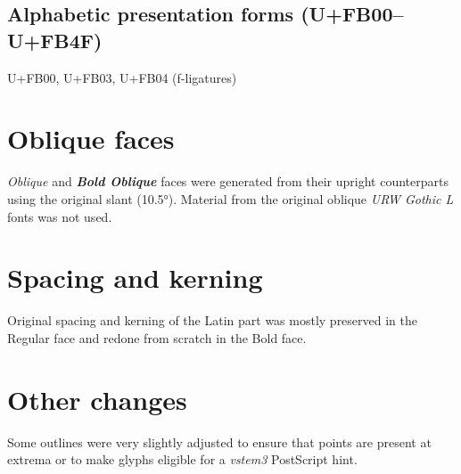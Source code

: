 \documentclass[a4paper,12pt,oneside,extrafontsizes]{memoir}
\begin{document}
\subsection{Alphabetic presentation forms (U+FB00--U+FB4F)}
U+FB00, U+FB03, U+FB04 (f-ligatures)

\section{Oblique faces}

\textit{Oblique} and \textbf{\textit{Bold Oblique}} faces were generated from their upright counterparts using the original slant (10.5°). Material from the original oblique \emph{URW Gothic L} fonts was not used.

\section{Spacing and kerning}

Original spacing and kerning of the Latin part was mostly preserved in the Regular face and redone from scratch in the Bold face.

\section{Other changes}

Some outlines were very slightly adjusted to ensure that points are present at extrema or to make glyphs eligible for a \emph{vstem3} PostScript hint.
\end{document}
